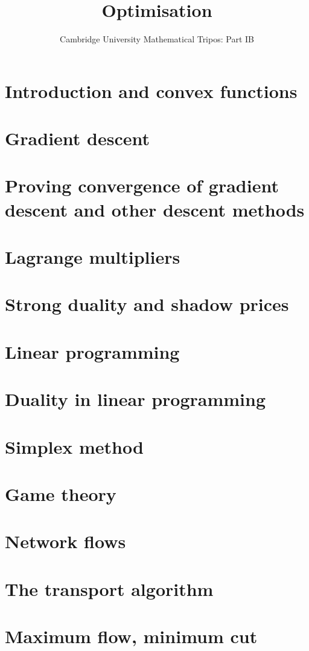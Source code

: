 \documentclass{article}
\title{Optimisation}
\author{Cambridge University Mathematical Tripos: Part IB}
\begin{document}
\maketitle

\tableofcontentsnewpage{}

\section{Introduction and convex functions}

\section{Gradient descent}

\section{Proving convergence of gradient descent and other descent methods}

\section{Lagrange multipliers}

\section{Strong duality and shadow prices}

\section{Linear programming}

\section{Duality in linear programming}

\section{Simplex method}

\section{Game theory}

\section{Network flows}

\section{The transport algorithm}

\section{Maximum flow, minimum cut}

\end{document}
